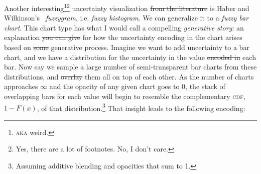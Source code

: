 \documentclass[journal]{vgtc}                     %
\providecommand{\DIFadd}[1]{{\protect\color{blue}\uwave{#1}}} %
\providecommand{\DIFdel}[1]{{\protect\color{red}\sout{#1}}}                      %
\providecommand{\DIFaddbegin}{} %
\providecommand{\DIFaddend}{} %
\providecommand{\DIFdelbegin}{} %
\providecommand{\DIFdelend}{} %
\begin{document}
Another interesting\footnote{\textsc{aka} weird.}\footnote{Yes, there are a lot of footnotes. No, I don't care.} uncertainty visualization \DIFdelbegin \DIFdel{from the literature }\DIFdelend is Haber and Wilkinson's~\cite{haber1982perceptual} \textit{fuzzygram}, i.e. \textit{fuzzy histogram}. We can generalize it to a \textit{fuzzy bar chart}. This chart type has what I would call a compelling \textit{generative story}: an explanation \DIFdelbegin \DIFdel{you can give }\DIFdelend for how the uncertainty encoding in the chart arises based on \DIFdelbegin \DIFdel{some }\DIFdelend \DIFaddbegin \DIFadd{a }\DIFaddend generative process. Imagine we want to add uncertainty to a bar chart, and we have a distribution for the uncertainty in the value \DIFdelbegin \DIFdel{encoded in }\DIFdelend \DIFaddbegin \DIFadd{of }\DIFaddend each bar. Now say we sample a large number of semi-transparent bar charts from these distributions, and \DIFdelbegin \DIFdel{overlay }\DIFdelend \DIFaddbegin \DIFadd{plot }\DIFaddend them all on top of each other. As the number of charts approaches $\infty$ and the opacity of any given chart goes to 0, the stack of overlapping bars for each value will begin to resemble the complementary \textsc{cdf}, $1 - F(x)$, of that distribution.\footnote{Assuming additive blending and opacities that sum to 1.} That insight leads to the following encoding:
\end{document}
